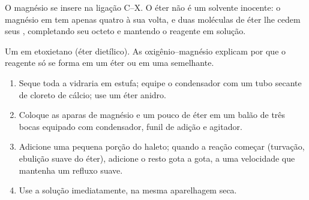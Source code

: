 O magnésio se insere na ligação C--X. O éter não é um solvente inocente:
o magnésio em  tem apenas quatro  à sua
volta, e duas moléculas de éter lhe cedem seus ,
completando seu octeto e mantendo o reagente em solução.

\begin{omfigure}

{\small Um  em etoxietano (éter dietílico). As
 oxigênio--magnésio explicam por que o reagente só se
forma em um éter ou em uma  semelhante.}
\end{omfigure}

\begin{method}\label{met:b1:organomagnesium:prepare}
\begin{enumerate}
  \item Seque toda a vidraria em estufa; equipe o condensador com um tubo
        secante de cloreto de cálcio; use um éter anidro.
  \item Coloque as aparas de magnésio e um pouco de éter em um balão de
        três bocas equipado com condensador, funil de adição e agitador.
  \item Adicione uma pequena porção do haleto; quando a reação começar
        (turvação, ebulição suave do éter), adicione o resto gota a gota,
        a uma velocidade que mantenha um refluxo suave.
  \item Use a solução imediatamente, na mesma aparelhagem seca.
\end{enumerate}
\end{method}

